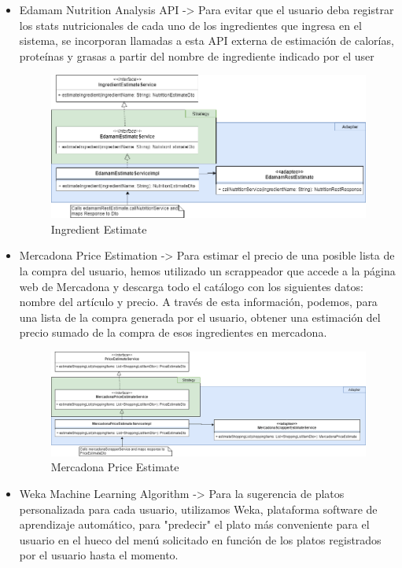 \documentclass[12pt, a4paper, twoside]{book}
\let\>\textgreater
\begin{document}
	\begin{itemize}
		\item Edamam Nutrition Analysis API -\> Para evitar que el usuario deba registrar los stats nutricionales de cada uno de los ingredientes que ingresa en el sistema, se incorporan llamadas a esta API externa de estimación de calorías, proteínas y grasas a partir del nombre de ingrediente indicado por el user
		\begin{figure}[H]
			\centering
			\includegraphics[width=15cm]{Imagenes/IngredientEstimateDesign.png}
			\caption{Ingredient Estimate}\label{Ingredient Estimate}
		\end{figure}
		\item Mercadona Price Estimation -\> Para estimar el precio de una posible lista de la compra del usuario, hemos utilizado un scrappeador que accede a la página web de Mercadona y descarga todo el catálogo con los siguientes datos: nombre del artículo y precio. A través de esta información, podemos, para una lista de la compra generada por el usuario, obtener una estimación del precio sumado de la compra de esos ingredientes en mercadona.
		\begin{figure}[H]
			\centering
			\includegraphics[width=15cm]{Imagenes/MercadonaPriceEstimate.png}
			\caption{Mercadona Price Estimate}\label{Mercadona Price Estimate}
		\end{figure}
		\item Weka Machine Learning Algorithm -\> Para la sugerencia de platos personalizada para cada usuario, utilizamos Weka, plataforma software de aprendizaje automático, para "predecir" el plato más conveniente para el usuario en el hueco del menú solicitado en función de los platos registrados por el usuario hasta el momento.

\end{itemize}
\end{document}
